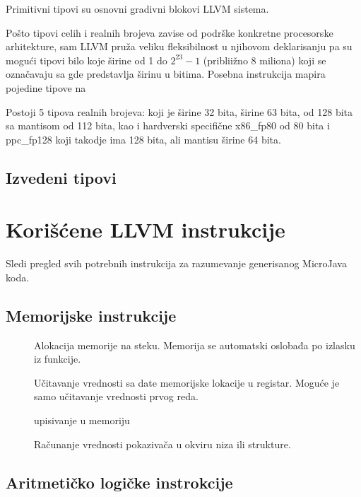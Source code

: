 Primitivni tipovi su osnovni gradivni blokovi LLVM sistema.

Pošto tipovi celih i realnih brojeva zavise od podrške konkretne procesorske arhitekture,
sam LLVM pruža veliku fleksibilnost u njihovom deklarisanju
pa su mogući tipovi bilo koje širine od 1 do $2^{23} - 1$ (pribliižno 8 miliona) koji se označavaju sa  gde  predstavlja širinu u bitima. Posebna instrukcija mapira pojedine tipove na 

Postoji 5 tipova realnih brojeva: 
 koji je širine 32 bita, 
 širine 63 bita, 
 od 128 bita sa mantisom od 112 bita, 
kao i hardverski specifične x86_fp80 od 80 bita 
i ppc_fp128 koji takodje ima 128 bita, ali mantisu širine 64 bita.


\subsection*{Izvedeni tipovi}





\section{Korišćene LLVM instrukcije}

Sledi pregled svih potrebnih instrukcija za razumevanje generisanog MicroJava koda.

\subsection*{Memorijske instrukcije}

\begin{description}
\item[] Alokacija memorije na steku. Memorija se automatski oslobađa po izlasku iz funkcije.
\item[] Učitavanje vrednosti sa date memorijske lokacije u registar. Moguće je samo učitavanje vrednosti prvog reda.
\item[] upisivanje u memoriju
\item[] Računanje vrednosti pokazivača u okviru niza ili strukture.
\end{description}

\subsection*{Aritmetičko logičke instrokcije}

